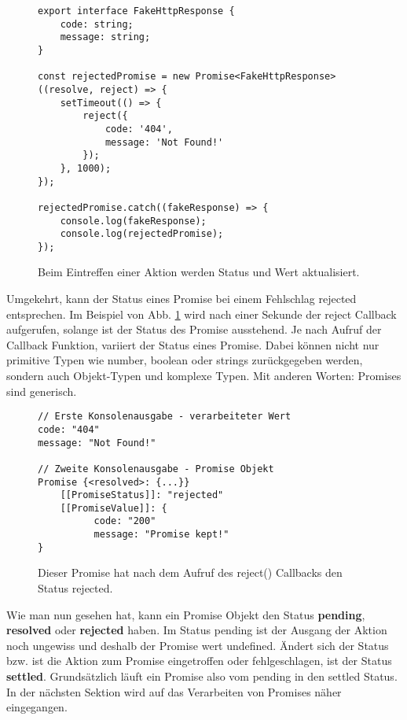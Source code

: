 \begin{figure}[H]
\begin{lstlisting}[basicstyle=\small]
export interface FakeHttpResponse {
    code: string;
    message: string;
}

const rejectedPromise = new Promise<FakeHttpResponse>((resolve, reject) => {
    setTimeout(() => {
        reject({
            code: '404',
            message: 'Not Found!'
        });
    }, 1000);
});

rejectedPromise.catch((fakeResponse) => {
    console.log(fakeResponse);
    console.log(rejectedPromise);
});
\end{lstlisting}
\caption{Beim Eintreffen einer Aktion werden Status und Wert aktualisiert.}
\label{rejected-promise}
\end{figure}

\noindent
Umgekehrt, kann der Status eines Promise bei einem Fehlschlag rejected entsprechen. Im Beispiel von Abb. \ref{rejected-promise} wird nach einer Sekunde der reject Callback aufgerufen, solange ist der Status des Promise ausstehend. Je nach Aufruf der Callback Funktion, variiert der Status eines Promise. Dabei können nicht nur primitive Typen wie number, boolean oder strings zurückgegeben werden, sondern auch Objekt-Typen und komplexe Typen. Mit anderen Worten: Promises sind generisch.

\begin{figure}[H]
\begin{lstlisting}
// Erste Konsolenausgabe - verarbeiteter Wert
code: "404"
message: "Not Found!"
    
// Zweite Konsolenausgabe - Promise Objekt
Promise {<resolved>: {...}}
    [[PromiseStatus]]: "rejected"
    [[PromiseValue]]: {
          code: "200"
          message: "Promise kept!"
}
\end{lstlisting}
\caption{Dieser Promise hat nach dem Aufruf des reject() Callbacks den Status rejected.}
\end{figure}

\noindent
Wie man nun gesehen hat, kann ein Promise Objekt den Status \textbf{pending}, \textbf{resolved} oder \textbf{rejected} haben. Im Status pending ist der Ausgang der Aktion noch ungewiss und deshalb der Promise wert undefined. Ändert sich der Status bzw. ist die Aktion zum Promise eingetroffen oder fehlgeschlagen, ist der Status \textbf{settled}. Grundsätzlich läuft ein Promise also vom pending in den settled Status. In der nächsten Sektion wird auf das Verarbeiten von Promises näher eingegangen.

